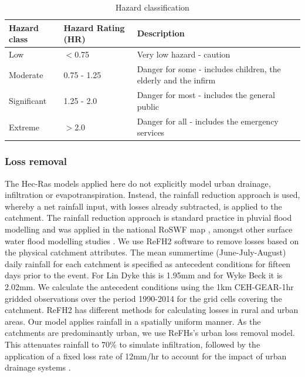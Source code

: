 \documentclass[APA,Times2COL]{WileyNJDv5}
\begin{document}
\setlength\tabcolsep{0pt}
\renewcommand{\arraystretch}{1.5} %
\begin{table}[h!]
\centering
\caption{Hazard classification \citep{envagency2019} }
\begin{tabular}{C{3cm} C{4cm} C{10cm}} 
 \hline
 \textbf{Hazard class} & \textbf{Hazard Rating (HR)} & \textbf{Description} \\ [0.5ex] 
 \hline
 Low & $<$0.75 & Very low hazard - caution \\
 Moderate & 0.75 - 1.25 & Danger for some - includes children, the elderly and the infirm\\
 Significant & 1.25 - 2.0 & Danger for most - includes the general public \\
 Extreme & $>$2.0 & Danger for all - includes the emergency services \\
 \hline
\end{tabular}
\label{table:hazard_cats}
\end{table}
\endgroup

\subsubsection{Loss removal}

The Hec-Ras models applied here do not explicitly model urban drainage, infiltration or evapotranspiration. Instead, the rainfall reduction approach is used, whereby a net rainfall input, with losses already subtracted, is applied to the catchment. The rainfall reduction approach is standard practice in pluvial flood modelling and was applied in the national RoSWF map \citep{envagency2019}, amongst other surface water flood modelling studies \citep{chen2009pluvial,chang2015novel, henonin2013real, wang2018integrated}. We use ReFH2 software to remove losses based on the physical catchment attributes. The mean summertime (June-July-August) daily rainfall for each catchment is specified as antecedent conditions for fifteen days prior to the event. For Lin Dyke this is 1.95mm and for Wyke Beck it is 2.02mm. We calculate the antecedent conditions using the 1km CEH-GEAR-1hr gridded observations \citep{lewis2019gridded} over the period 1990-2014 for the grid cells covering the catchment. ReFH2 has different methods for calculating losses in rural and urban areas. Our model applies rainfall in a spatially uniform manner. As the catchments are predominantly urban, we use ReFHs's urban loss removal model. This attenuates rainfall to 70\% to simulate infiltration, followed by the application of a fixed loss rate of 12mm/hr to account for the impact of urban drainage systems \citep{envagency2019}. 
\end{document}
